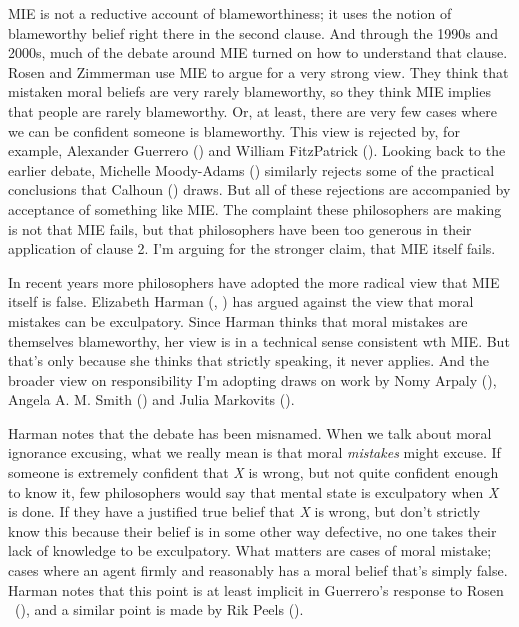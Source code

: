 \documentclass[
  10pt,
  letterpaper,
  twoside]{scrbook}
\begin{document}
MIE is not a reductive account of blameworthiness; it uses the notion of
blameworthy belief right there in the second clause. And through the
1990s and 2000s, much of the debate around MIE turned on how to
understand that clause. Rosen and Zimmerman use MIE to argue for a very
strong view. They think that mistaken moral beliefs are very rarely
blameworthy, so they think MIE implies that people are rarely
blameworthy. Or, at least, there are very few cases where we can be
confident someone is blameworthy. This view is rejected by, for example,
{Alex}ander Guerrero () and William
FitzPatrick (). Looking back to the
earlier debate, Michelle Moody-Adams
() similarly rejects some of the
practical conclusions that Calhoun ()
draws. But all of these rejections are accompanied by acceptance of
something like MIE. The complaint these philosophers are making is not
that MIE fails, but that philosophers have been too generous in their
application of clause 2. I'm arguing for the stronger claim, that MIE
itself fails.

In recent years more philosophers have adopted the more radical view
that MIE itself is false. Elizabeth Harman
(, ) has
argued against the view that moral mistakes can be exculpatory. Since
Harman thinks that moral mistakes are themselves blameworthy, her view
is in a technical sense consistent wth MIE. But that's only because she
thinks that strictly speaking, it never applies. And the broader view on
responsibility I'm adopting draws on work by Nomy Arpaly
(), Angela A. M. Smith
() and Julia Markovits
().

Harman notes that the debate has been misnamed. When we talk about moral
ignorance excusing, what we really mean is that moral \emph{mistakes}
might excuse. If someone is extremely confident that \emph{X} is wrong,
but not quite confident enough to know it, few philosophers would say
that mental state is exculpatory when \emph{X} is done. If they have a
justified true belief that \emph{X} is wrong, but don't strictly know
this because their belief is in some other way defective, no one takes
their lack of knowledge to be exculpatory. What matters are cases of
moral mistake; cases where an agent firmly and reasonably has a moral
belief that's simply false. Harman notes that this point is at least
implicit in Guerrero's response to Rosen
~(), and a similar point is
made by Rik Peels ().
\end{document}

